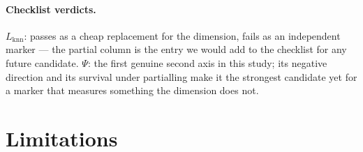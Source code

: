 \documentclass[10pt]{article}
\begin{document}
\paragraph{Checklist verdicts.} $L_{\mathrm{knn}}$: passes as a cheap
replacement for the dimension, fails as an independent marker --- the partial
column is the entry we would add to the checklist for any future candidate.
$\Psi$: the first genuine second axis in this study; its negative direction
and its survival under partialling make it the strongest candidate yet for a
marker that measures something the dimension does not.

\section{Limitations}

\label{sec:limitations}
\end{document}
